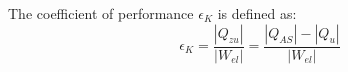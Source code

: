 The coefficient of performance \( \epsilon_K \) is defined as:  
\[
\epsilon_K = \frac{|Q_{zu}|}{|W_{el}|} = \frac{|Q_{AS}| - |Q_{u}|}{|W_{el}|}
\]